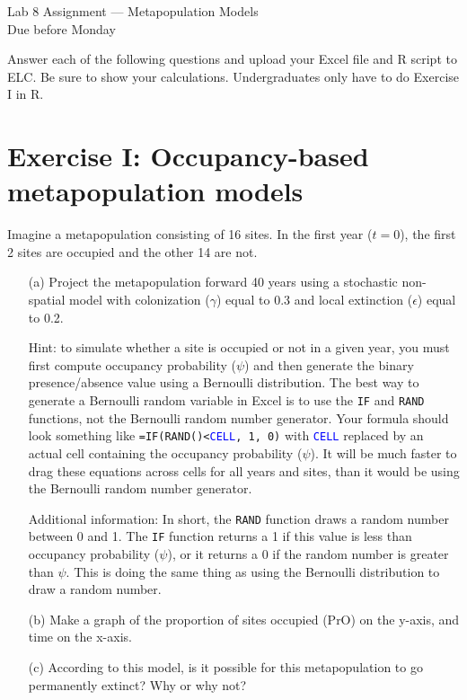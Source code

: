 \documentclass[12pt]{article}\usepackage[]{graphicx}\usepackage[]{color}
\begin{document}
{
  \Large
  \centering
  Lab 8 Assignment --- Metapopulation Models \\
  Due before Monday \\
}

\vspace{6pt}

Answer each of the following questions and upload your Excel file and
R script to ELC. Be sure to show your calculations. Undergraduates
only have to do Exercise I in R. \\

\vspace{6pt}

\section*{Exercise I: Occupancy-based metapopulation models}


Imagine a metapopulation consisting of 16 sites. In the first year
($t=0$), the first 2 sites are occupied and the other 14 are not.
\begin{enumerate}
  \item[(a)] Project the metapopulation forward 40 years using a
    stochastic non-spatial model with colonization ($\gamma$) equal to
    0.3 and local extinction ($\epsilon$) equal to 0.2.

    Hint: to simulate whether a site is occupied or not in a given year,
    you must first compute occupancy probability ($\psi$) and then generate
    the binary presence/absence value using a Bernoulli distribution. The
    best way to generate a Bernoulli random variable in Excel is to use
    the \texttt{IF} and \texttt{RAND} functions, not the Bernoulli
    random number generator. Your formula should look something like
    \texttt{=IF(RAND()<\textcolor{blue}{CELL}, 1, 0)} with
    \texttt{\textcolor{blue}{CELL}} replaced by an  
    actual cell containing the occupancy probability
    ($\psi$). It will be much faster to drag these equations across
    cells for all years and sites, than it would be using the
    Bernoulli random number generator.

    Additional information: In short, the \texttt{RAND} function draws a
    random number between 0 and 1. The \texttt{IF} function returns a 1 if
    this value is less than occupancy probability ($\psi$), or it returns
    a 0 if the random number is greater than $\psi$. This is doing the
    same thing as using the Bernoulli distribution to draw a random
    number.
  \item[(b)] Make a graph of the proportion of sites occupied (PrO)
    on the y-axis, and time on the x-axis.
  \item[(c)] According to this model, is it possible for this
    metapopulation to go permanently extinct? Why or why not?
\end{enumerate}
\end{document}
